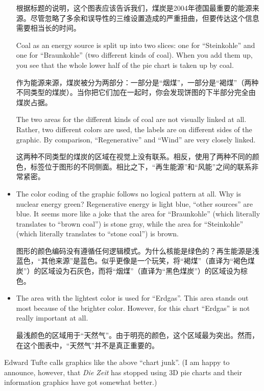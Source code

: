 \begin{itemize}
        根据标题的说明，这个图表应该告诉我们，煤炭是2004年德国最重要的能源来源。尽管忽略了多余和误导性的三维设置造成的严重扭曲，但要传达这个信息需要相当长的时间。



        Coal as an energy source is split up into two slices: one for
        ``Steinkohle'' and one for ``Braunkohle'' (two different kinds of
        coal). When you add them up, you see that the whole lower half of
        the pie chart is taken up by coal.

        作为能源来源，煤炭被分为两部分：一部分是“烟煤”，一部分是“褐煤”（两种不同类型的煤炭）。当你把它们加在一起时，你会发现饼图的下半部分完全由煤炭占据。



        The two areas for the different kinds of coal are not visually
        linked at all. Rather, two different colors are used, the labels are
        on different sides of the graphic. By comparison, ``Regenerative''
        and ``Wind'' are very closely linked.

        这两种不同类型的煤炭的区域在视觉上没有联系。相反，使用了两种不同的颜色，标签位于图形的不同侧面。相比之下，“再生能源”和“风能”之间的联系非常紧密。


    \item The color coding of the graphic follows no logical pattern at all.
        Why is nuclear energy green? Regenerative energy is light blue,
        ``other sources'' are blue. It seems more like a joke that the area
        for ``Braunkohle'' (which literally translates to ``brown coal'') is
        stone gray, while the area for ``Steinkohle'' (which literally
        translates to ``stone coal'') is brown.

        图形的颜色编码没有遵循任何逻辑模式。为什么核能是绿色的？再生能源是浅蓝色，“其他来源”是蓝色。似乎更像是一个玩笑，将“褐煤”（直译为“褐色煤炭”）的区域设为石灰色，而将“烟煤”（直译为“黑色煤炭”）的区域设为棕色。


    \item The area with the lightest color is used for ``Erdgas''. This area
        stands out most because of the brighter color. However, for this
        chart ``Erdgas'' is not really important at all.

        最浅颜色的区域用于“天然气”。由于明亮的颜色，这个区域最为突出。然而，在这个图表中，“天然气”并不是真正重要的。


\end{itemize}
%
Edward Tufte calls graphics like the above ``chart junk''. (I am happy to
announce, however, that \emph{Die Zeit} has stopped using 3D pie charts and
their information graphics have got somewhat better.)

